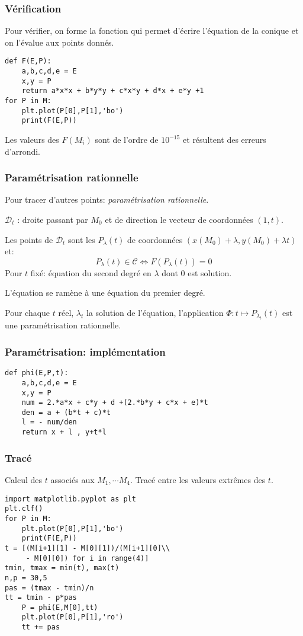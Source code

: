 \begin{frame}[fragile]
  \frametitle{Vérification}
Pour vérifier, on forme la fonction qui permet d'écrire l'équation de la conique et on l'évalue aux points donnés.
\begin{verbatim}
def F(E,P):
    a,b,c,d,e = E
    x,y = P
    return a*x*x + b*y*y + c*x*y + d*x + e*y +1
for P in M:
    plt.plot(P[0],P[1],'bo')
    print(F(E,P))
\end{verbatim}
Les valeurs des $F(M_i)$ sont de l'ordre de $10^{-15}$ et résultent des erreurs d'arrondi.
\end{frame}

\begin{frame}
  \frametitle{Paramétrisation rationnelle}
Pour tracer d'autres points: \emph{paramétrisation rationnelle}.

$\mathcal{D}_t$ : droite passant par $M_0$ et de direction le vecteur de coordonnées $(1,t)$.

Les points de  $\mathcal{D}_t$ sont les $P_\lambda(t)$  de coordonnées $(x(M_0)+\lambda, y(M_0)+\lambda t)$ et:
\begin{displaymath}
P_\lambda(t) \in \mathcal{C} \Leftrightarrow F(P_\lambda(t)) = 0  
\end{displaymath}
Pour $t$ fixé: équation du second degré en $\lambda$ dont $0$ est solution. 

L'équation se ramène à une équation du premier degré.

Pour chaque $t$ réel, $\lambda_t$ la solution de l'équation, l'application $\Phi : t \mapsto P_{\lambda_t}(t)$ est une paramétrisation rationnelle.
\end{frame}

\begin{frame}[fragile]
  \frametitle{Paramétrisation: implémentation}
\begin{verbatim}
def phi(E,P,t):
    a,b,c,d,e = E
    x,y = P
    num = 2.*a*x + c*y + d +(2.*b*y + c*x + e)*t
    den = a + (b*t + c)*t
    l = - num/den
    return x + l , y+t*l
\end{verbatim}
\end{frame}

\begin{frame}[fragile]
  \frametitle{Tracé}
Calcul des $t$ associés aux $M_1,\cdots M_4$. Tracé entre les valeurs extrêmes des $t$.
\begin{verbatim}
import matplotlib.pyplot as plt
plt.clf()
for P in M:
    plt.plot(P[0],P[1],'bo')
    print(F(E,P))
t = [(M[i+1][1] - M[0][1])/(M[i+1][0]\\
     - M[0][0]) for i in range(4)]
tmin, tmax = min(t), max(t)
n,p = 30,5
pas = (tmax - tmin)/n
tt = tmin - p*pas
    P = phi(E,M[0],tt)
    plt.plot(P[0],P[1],'ro')
    tt += pas
\end{verbatim}
\end{frame}




